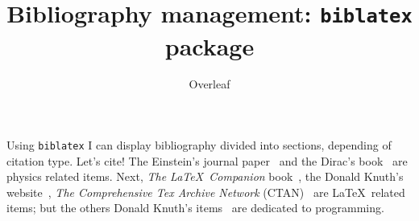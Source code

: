 \documentclass{article}
\title{Bibliography management: \texttt{biblatex} package}
\author{Overleaf}
\date{ }
\begin{document}
\maketitle

Using \texttt{biblatex} I can display bibliography divided into sections,
depending of citation type.
Let's cite! The Einstein's journal paper~\cite{einstein} and the Dirac's
book~\cite{dirac} are physics related items.
Next, \textit{The \LaTeX\ Companion} book~\cite{latexcompanion}, the Donald
Knuth's website~\cite{knuthwebsite}, \textit{The Comprehensive Tex Archive
	Network} (CTAN)~\cite{ctan} are \LaTeX\ related items; but the others Donald
Knuth's items~\cite{knuth-fa,knuth-acp} are dedicated to programming.

\medskip

\printbibliography%
\end{document}
